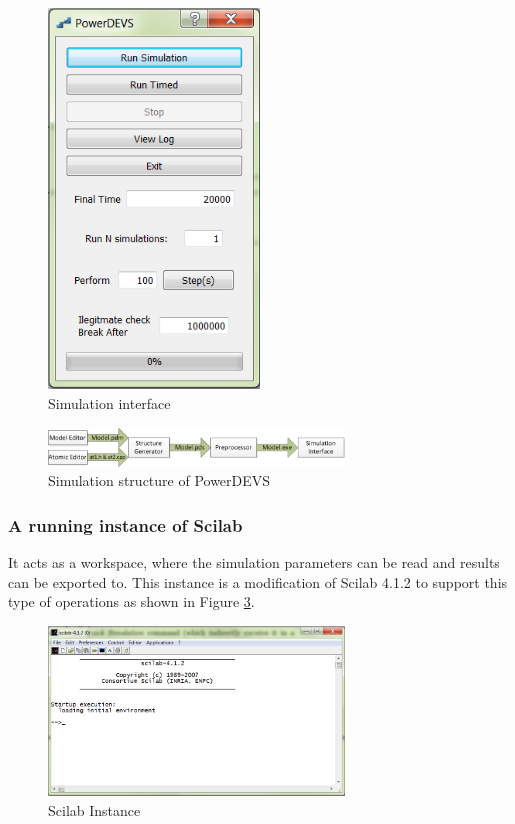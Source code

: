 \documentclass[titlepage]{article}%
\begin{document}
{\begin{figure}[ht!]
  \centering
    \includegraphics[width=0.5\textwidth]{Fig8.png}
    \caption{Simulation interface}
    \label{sim_int}
\end{figure}


\begin{figure}[h!]
  \centering
    \includegraphics[width=0.7\textwidth]{Fig9.png}
    \caption{Simulation structure of PowerDEVS}
    \label{sim_st}
\end{figure}


 
\subsubsection{A running instance of Scilab}

It acts as a workspace, where the simulation parameters can be read and results can be exported to. This instance is a modification of Scilab 4.1.2 to support this type of operations as shown in Figure \ref{sci_in}.




\begin{figure}[ht!]
  \centering
    \includegraphics[width=0.7\textwidth]{Fig10.png}
    \caption{Scilab Instance}
    \label{sci_in}
\end{figure}

}
\end{document}
